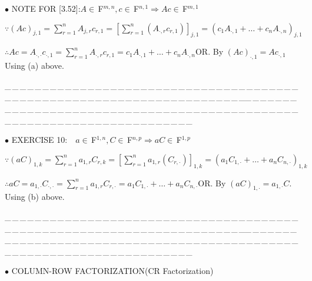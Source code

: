 \documentclass[a4paper, 11pt, UTF8]{article}
\def\Fbfc{$\,{\timesbf F}$}
\begin{document}
\begin{large}
{\small $\bullet$} {\timesbf\Large N{\normalsize OTE} F{\normalsize OR} [3.52]:}\quad $A\in\Fbfc^{m,n},c\in\Fbfc^{n,1}\Rightarrow Ac\in\Fbfc^{m,1}$\par\quad
$\because(Ac)_{j,1}=\sum\limits_{r=1}^n A_{j,r}c_{r,1}=[\sum\limits_{r=1}^n(A_{\cdot,r}c_{r,1})]_{j,1}=(c_1 A_{\cdot,1}+\dots+c_n A_{\cdot,n})_{j,1}$\par\quad
$\therefore Ac=A_{\cdot,\cdot}c_{\cdot,1}=\sum\limits_{r=1}^n A_{\cdot,r}c_{r,1}=c_1 A_{\cdot,1}+\dots+c_n A_{\cdot,n}$\quad O{\small R}. By $(Ac)_{\cdot,1}=Ac_{\cdot,1}$ Using (a) above.\par
{\tiny \_\,\_\,\_\,\_\,\_\,\_\,\_\,\_\,\_\,\_\,\_\,\_\,\_\,\_\,\_\,\_\,\_\,\_\,\_\,\_\,\_\,\_\,\_\,\_\,\_\,\_\,\_\,\_\,\_\,\_\,\_\,\_\,\_\,\_\,\_\,\_\,\_\,\_\,\_\,\_\,\_\,\_\,\_\,\_\,\_\,\_\,\_\,\_\,\_\,\_\,\_\,\_\,\_\,\_\,\_\,\_\,\_\,\_\,\_\,\_\,\_\,\_\,\_\,\_\,\_\,\_\,\_\,\_\,\_\,\_\,\_\_\,\_\,\_\,\_\,\_\,\_\,\_\,\_\,\_\,\_\,\_\,\_\,\_\,\_\,\_\,\_\,\_\,\_\,\_\,\_\,\_\,\_\,\_\,\_\,\_\,\_\,\_\,\_\,\_\,\_\,\_\,\_\,\_\,\_\,\_\,\_\,\_\,\_\,\_\,\_\,\_\,\_\,\_\,\_\,\_\,\_\,\_\,\_\,\_\,\_\,\_\,\_\,\_\,\_\,\_\,\_\,\_\,\_\,\_\,\_\,\_\,\_\,\_\,\_\,\_\,\_\,\_\,\_\,\_\,\_\,\_}\par
{\small $\bullet$} {\timesbf\Large E{\normalsize XERCISE} 10:}\qquad\,\,\,\, $a\in\Fbfc^{1,n},C\in\Fbfc^{n,p}\Rightarrow aC\in\Fbfc^{1,p}$\par\quad
$\because(aC)_{1,k}=\sum\limits_{r=1}^n a_{1,r}C_{r,k}=[\sum\limits_{r=1}^n a_{1,r}(C_{r,\cdot})]_{1,k}=(a_1 C_{1,\cdot}+\dots+a_n C_{n,\cdot})_{1,k}$\par\quad
$\therefore aC=a_{1,\cdot}C_{\cdot,\cdot}=\sum\limits_{r=1}^n a_{1,r}C_{r,\cdot}=a_1 C_{1,\cdot}+\dots+a_n C_{n,\cdot}$\quad O{\small R}. By $(aC)_{1,\cdot}=a_{1,\cdot}C$. Using (b) above.
\par
{\tiny \_\,\_\,\_\,\_\,\_\,\_\,\_\,\_\,\_\,\_\,\_\,\_\,\_\,\_\,\_\,\_\,\_\,\_\,\_\,\_\,\_\,\_\,\_\,\_\,\_\,\_\,\_\,\_\,\_\,\_\,\_\,\_\,\_\,\_\,\_\,\_\,\_\,\_\,\_\,\_\,\_\,\_\,\_\,\_\,\_\,\_\,\_\,\_\,\_\,\_\,\_\,\_\,\_\,\_\,\_\,\_\,\_\,\_\,\_\,\_\,\_\,\_\,\_\,\_\,\_\,\_\,\_\,\_\,\_\,\_\,\_\_\,\_\,\_\,\_\,\_\,\_\,\_\,\_\,\_\,\_\,\_\,\_\,\_\,\_\,\_\,\_\,\_\,\_\,\_\,\_\,\_\,\_\,\_\,\_\,\_\,\_\,\_\,\_\,\_\,\_\,\_\,\_\,\_\,\_\,\_\,\_\,\_\,\_\,\_\,\_\,\_\,\_\,\_\,\_\,\_\,\_\,\_\,\_\,\_\,\_\,\_\,\_\,\_\,\_\,\_\,\_\,\_\,\_\,\_\,\_\,\_\,\_\,\_\,\_\,\_\,\_\,\_\,\_\,\_\,\_\,\_}\par
{\small $\bullet$} {\Large C{\normalsize OLUMN}-R{\normalsize OW} F{\normalsize ACTORIZATION}}\qquad (CR Factorization)\par\,\,\,

\end{large}
\end{document}
